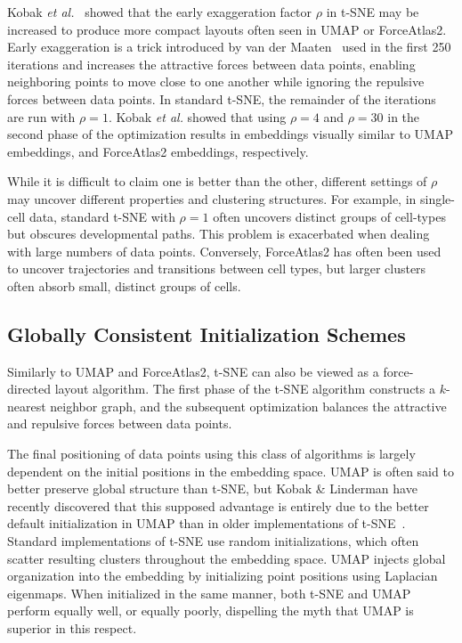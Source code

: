 \documentclass[twocolumn]{bmcart}
\begin{document}
Kobak \textit{et al.}~\cite{todo} showed that the early exaggeration factor
$\rho$ in t-SNE may be increased to produce more compact layouts often seen in
UMAP or ForceAtlas2. Early exaggeration is a trick introduced by van der
Maaten~\cite{maaten2008visualizing} used in the first 250 iterations and
increases the attractive forces between data points, enabling neighboring
points to move close to one another while ignoring the repulsive forces between
data points. In standard t-SNE, the remainder of the iterations are run with
$\rho=1$. Kobak \textit{et al.} showed that using $\rho=4$ and $\rho=30$ in the
second phase of the optimization results in embeddings visually similar to UMAP
embeddings, and ForceAtlas2 embeddings, respectively.

While it is difficult to claim one is better than the other, different settings
of $\rho$ may uncover different properties and clustering structures. For
example, in single-cell data, standard t-SNE with $\rho=1$ often uncovers
distinct groups of cell-types but obscures developmental paths. This problem is
exacerbated when dealing with large numbers of data points. Conversely,
ForceAtlas2 has often been used to uncover trajectories and transitions between
cell types, but larger clusters often absorb small, distinct groups of cells.

\subsection*{Globally Consistent Initialization Schemes}

Similarly to UMAP and ForceAtlas2, t-SNE can also be viewed as a force-directed
layout algorithm. The first phase of the t-SNE algorithm constructs a
$k$-nearest neighbor graph, and the subsequent optimization balances the
attractive and repulsive forces between data points.

The final positioning of data points using this class of algorithms is largely
dependent on the initial positions in the embedding space. UMAP is often said
to better preserve global structure than t-SNE, but Kobak \& Linderman have
recently discovered that this supposed advantage is entirely due to the better
default initialization in UMAP than in older implementations of
t-SNE~\cite{kobak2019umap}. Standard implementations of t-SNE use random
initializations, which often scatter resulting clusters throughout the
embedding space. UMAP injects global organization into the embedding by
initializing point positions using Laplacian eigenmaps. When initialized in the
same manner, both t-SNE and UMAP perform equally well, or equally poorly,
dispelling the myth that UMAP is superior in this respect.
\end{document}
